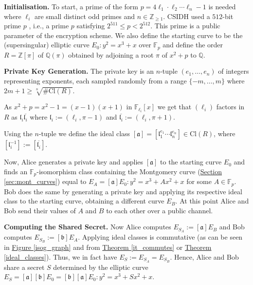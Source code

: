 \documentclass[openany, a4paper, 10pt]{book}
\theoremstyle{plain}
\theoremstyle{plain}
\theoremstyle{plain}
\theoremstyle{definition}
\theoremstyle{plain}
\theoremstyle{definition}
\theoremstyle{remark}
\newcommand{\figref}[1]{\hyperref[#1]{Figure \ref{#1}}}
\newcommand{\theoref}[1]{\hyperref[#1]{Theorem \ref{#1}}}
\newcommand{\secref}[1]{\hyperref[#1]{Section \ref{#1}}}
\begin{document}
\begin{cryptobox}[label={CSIDH_encryption}, nameref={CSIDH encryption scheme}]
    \textbf{Initialisation.} To start, a prime of the form $p=4\ell_1 \cdot \ell_2 \cdots \ell_n - 1$ is needed
    where $\ell_i$ are small distinct odd primes and $n \in \mathbb Z_{\geq 1}$.
    CSIDH used a $512$-bit prime $p$ \cite[Section~8.1]{CSIDH}, i.e., a prime $p$ satisfying $2^{511} \leq p < 2^{512}$.
    This prime is a public parameter of the encryption scheme.
    We also define the starting curve to be the (supersingular) elliptic curve $E_0: y^2 = x^3 + x$ over $\mathbb F_p$ and define the order $R = \mathbb Z[\pi]$ of $\mathbb Q(\pi)$ obtained by adjoining a root $\pi$ of $x^2+p$ to $\mathbb Q$.

    \textbf{Private Key Generation.}
    The private key is an $n$-tuple $(e_1, \dots, e_n)$ of integers representing exponents, each sampled randomly from a range $\{ -m, \dots, m \}$
    where $2m+1 \geq \sqrt[n]{\#\mathrm{Cl}(R)}$.

    As $x^2 + p = x^2 - 1 = (x-1)(x+1)$ in $\mathbb F_{\ell_i}[x]$ we get that $(\ell_i)$ factors in $R$ as $\mathfrak l_i \overline{\mathfrak l_i}$ where $\mathfrak l_i := (\ell_i, \pi-1)$ and $\overline{\mathfrak l_i} := (\ell_i, \pi+1)$.

    Using the $n$-tuple we define the ideal class $[\mathfrak a] = [\mathfrak l_1^{e_1} \cdots \mathfrak l_n^{e_n}] \in \mathrm{Cl}(R)$, where $[\mathfrak l_i^{-1}] := [\overline{\mathfrak l_i}]$.

    Now, Alice generates a private key and applies $[\mathfrak a]$ to the starting curve $E_0$ and finds an $\mathbb F_p$-isomorphism class containing the Montgomery curve (\secref{sec:mont_curves}) equal to
    $E_A = [\mathfrak a] E_0: y^2 = x^3 + A x^2 + x$ for some $A \in \mathbb F_p$.
    Bob does the same by generating a private key and applying its respective ideal class to the starting curve, obtaining a different curve $E_B$.
    At this point Alice and Bob send their values of $A$ and $B$ to each other over a public channel.

    \textbf{Computing the Shared Secret.}
    Now Alice computes $E_{S_A} := [\mathfrak a]E_B$ and Bob computes $E_{S_B} := [\mathfrak b] E_A$.
    Applying ideal classes is commutative (as can be seen in \figref{isog_graph} and from \theoref{it_commutes} or \theoref{ideal_classes}).
    Thus, we in fact have $E_S := E_{S_A} = E_{S_B}$.
    Hence, Alice and Bob share a secret $S$ determined by the elliptic curve $E_S = [\mathfrak a][\mathfrak b] E_0 = [\mathfrak b][\mathfrak a] E_0: y^2 = x^3 + Sx^2 + x$.
\end{cryptobox}
\end{document}
